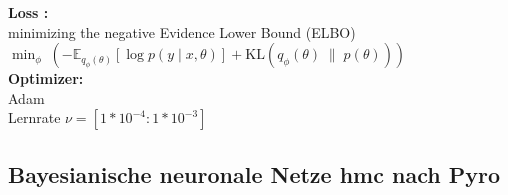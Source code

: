 \begin{center}
\begin{minipage}[t]{0.48\textwidth}
\textbf{\glqq Loss \grqq:} \\
\glqq minimizing the negative Evidence Lower Bound (ELBO)\grqq ~\parencite[S.6 Z.5-8]{PyroPplDevelopers.2024}
$
\min_{\phi} \; \left( 
    - \mathbb{E}_{q_{\phi}(\theta)} 
    \left[ 
        \log p(y \mid x, \theta)
    \right]
    + \mathrm{KL}\left( 
        q_{\phi}(\theta) \;\|\; p(\theta)
    \right)
\right)
$
\\[4pt]

\textbf{Optimizer:} \\
Adam ~\parencite[S. 6, Z. 9–10]{PyroPplDevelopers.2024} \\
Lernrate $\nu = [1 * 10^{-4}:1 * 10^{-3}]$ \\
\end{minipage}
\end{center}




\newpage

\subsection*{\gls{Bayesianische neuronale Netze} \gls{hmc} nach Pyro \parencite{PyroPplDevelopers.2024}}

\par\noindent\\

